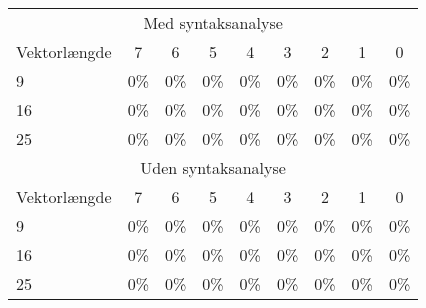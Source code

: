 \begin{tabular}{|l|c|c|c|c|c|c|c|c|}\hline
\rowcolor[gray]{0.9} \multicolumn{9}{|>{\columncolor[gray]{0.9}}c|}{\textbf{Kontrolsæt}} \\\hline
\multicolumn{9}{|c|}{Med syntaksanalyse}\\\hline
Vektorlængde & 7 & 6 & 5 & 4 & 3 & 2 & 1 & 0\\\hline
9 & 0\% & 0\% & 0\% & 0\% & 0\% & 0\% & 0\% & 0\% \\\hline
16 & 0\% & 0\% & 0\% & 0\% & 0\% & 0\% & 0\% & 0\%\\\hline
25 & 0\% & 0\% & 0\% & 0\% & 0\% & 0\% & 0\% & 0\%\\\hline 
\multicolumn{9}{|c|}{Uden syntaksanalyse}\\\hline
Vektorlængde & 7 & 6 & 5 & 4 & 3 & 2 & 1 & 0\\\hline
9 & 0\% & 0\% & 0\% & 0\% & 0\% & 0\% & 0\% & 0\% \\\hline
16 & 0\% & 0\% & 0\% & 0\% & 0\% & 0\% & 0\% & 0\%\\\hline
25 & 0\% & 0\% & 0\% & 0\% & 0\% & 0\% & 0\% & 0\%\\\hline 
\end{tabular}

\begin{comment}
\begin{tabular}{|l|c|c|c|}\hline
\rowcolor[gray]{0.9} \multicolumn{4}{|>{\columncolor[gray]{0.9}}c|}{\textbf{Træningssæt}} \\ \hline
Vektorlængde & Alle tegn & Bogstaver & Tal \\\hline
9 & 0\% & 0\% & 0\% \\\hline
16 & 0\% & 0\% & 0\%\\\hline
25 & 0\% & 0\% & 0\%\\\hline \end{tabular}

\begin{tabular}{|l|c|c|c|}\hline
\rowcolor[gray]{0.9} \multicolumn{4}{|>{\columncolor[gray]{0.9}}c|}{\textbf{Kontrolsæt}} \\ \hline
Vektorlængde & Alle tegn & Bogstaver & Tal \\\hline
9 & 0\% & 0\% & 0\% \\\hline
16 & 0\% & 0\% & 0\% \\\hline
25 & 0\% & 0\% & 0\% \\\hline \end{tabular}
\end{comment}

